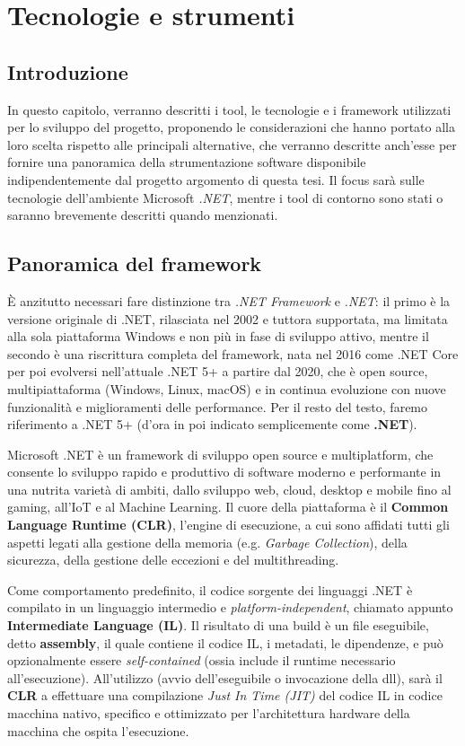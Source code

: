 \chapter{Tecnologie e strumenti}
\section{Introduzione}
In questo capitolo, verranno descritti i tool, le tecnologie e i framework utilizzati per lo sviluppo del progetto, proponendo le considerazioni che hanno portato alla loro scelta rispetto alle principali alternative, che verranno descritte anch'esse per fornire una panoramica della strumentazione software disponibile indipendentemente dal progetto argomento di questa tesi.
Il focus sarà sulle tecnologie dell'ambiente Microsoft \emph{.NET}, mentre i tool di contorno sono stati o saranno brevemente descritti quando menzionati.

\section{Panoramica del framework}
È anzitutto necessari fare distinzione tra \emph{.NET Framework} e \emph{.NET}: il primo è la versione originale di .NET, rilasciata nel 2002 e tuttora supportata, ma limitata alla sola piattaforma Windows e non più in fase di sviluppo attivo, mentre il secondo è una riscrittura completa del framework, nata nel 2016 come .NET Core per poi evolversi nell'attuale .NET 5+ a partire dal 2020, che è open source, multipiattaforma (Windows, Linux, macOS) e in continua evoluzione con nuove funzionalità e miglioramenti delle performance. Per il resto del testo, faremo riferimento a .NET 5+ (d'ora in poi indicato semplicemente come \textbf{.NET}).

Microsoft .NET è un framework di sviluppo open source e multiplatform, che consente lo sviluppo rapido e produttivo di software moderno e performante in una nutrita varietà di ambiti, dallo sviluppo web, cloud, desktop e mobile fino al gaming, all'IoT e al Machine Learning.
Il cuore della piattaforma è il \textbf{Common Language Runtime (CLR)}, l'engine di esecuzione, a cui sono affidati tutti gli aspetti legati alla gestione della memoria (e.g. \emph{Garbage Collection}), della sicurezza, della gestione delle eccezioni e del multithreading.

Come comportamento predefinito, il codice sorgente dei linguaggi .NET è compilato in un linguaggio intermedio e \emph{platform-independent}, chiamato appunto \textbf{Intermediate Language (IL)}. Il risultato di una build è un file eseguibile, detto \textbf{assembly}, il quale contiene il codice IL, i metadati, le dipendenze, e può opzionalmente essere \emph{self-contained} (ossia include il runtime necessario all'esecuzione). All'utilizzo (avvio dell'eseguibile o invocazione della dll), sarà il \textbf{CLR} a effettuare una compilazione \emph{Just In Time (JIT)} del codice IL in codice macchina nativo, specifico e ottimizzato per l'architettura hardware della macchina che ospita l'esecuzione.

